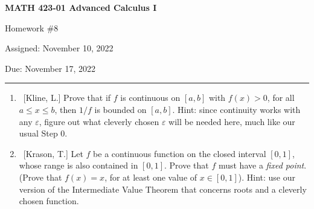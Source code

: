\documentclass[10pt]{article}
\theoremstyle{definition}
\begin{document}
\pagestyle{empty}  %

\begin{center}  %

{\bf MATH 423-01  Advanced Calculus I

Homework \#8

Assigned: November 10, 2022

Due: November 17, 2022}

\end{center}

\medskip

\hrule   %

\bigskip


\begin{enumerate}


\item  ~[Kline, L.] Prove that if $f$ is continuous on $[a,b]$ with $f(x) > 0$, for all $a \leq x \leq b$, then $1/f$ is bounded on $[a,b]$.  Hint: since continuity works with any $\varepsilon$, figure out what cleverly chosen $\varepsilon$ will be needed here, much like our usual Step 0.

	
%
%	
%	
%	
%	
	

\item  ~[Krason, T.] Let $f$ be a continuous function on the closed interval $[0,1]$, whose range is also contained in $[0,1]$.  Prove that $f$ must have a \emph{fixed point}. (Prove that $f(x) = x$, for at least one value of $x \in [0,1]$).  Hint: use our version of the Intermediate Value Theorem that concerns roots and a cleverly chosen function.
	

\end{enumerate}
\end{document}
